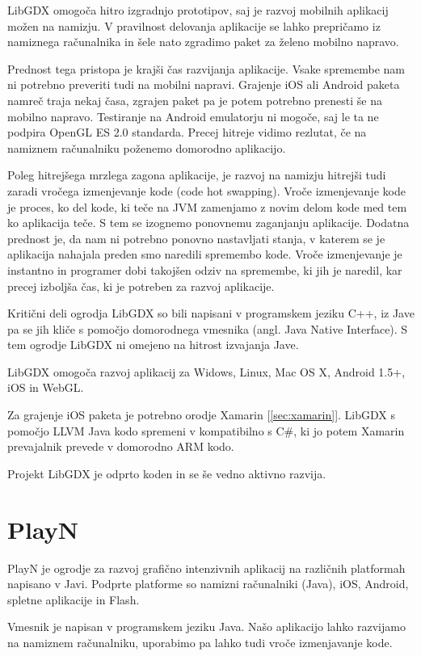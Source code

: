 LibGDX omogoča hitro izgradnjo prototipov, saj je razvoj mobilnih aplikacij možen na namizju. V pravilnost delovanja aplikacije se lahko prepričamo iz namiznega računalnika in šele nato zgradimo paket za želeno mobilno napravo. 

Prednost tega pristopa je krajši čas razvijanja aplikacije. Vsake spremembe nam ni potrebno preveriti tudi na mobilni napravi. Grajenje iOS ali Android paketa namreč traja nekaj časa, zgrajen paket pa je potem potrebno prenesti še na mobilno napravo. Testiranje na Android emulatorju ni mogoče, saj le ta ne podpira OpenGL ES 2.0 standarda. Precej hitreje vidimo rezlutat, če na namiznem računalniku poženemo domorodno aplikacijo.

Poleg hitrejšega mrzlega zagona aplikacije, je razvoj na namizju hitrejši tudi zaradi vročega izmenjevanje kode (code hot swapping). Vroče izmenjevanje kode je proces, ko del kode, ki teče na JVM zamenjamo z novim delom kode med tem ko aplikacija teče. S tem se izognemo ponovnemu zaganjanju aplikacije. Dodatna prednost je, da nam ni potrebno ponovno nastavljati stanja, v katerem se je aplikacija nahajala preden smo naredili spremembo kode. Vroče izmenjevanje je instantno in programer dobi takojšen odziv na spremembe, ki jih je naredil, kar precej izboljša čas, ki je potreben za razvoj aplikacije.

Kritični deli ogrodja LibGDX so bili napisani v programskem jeziku C++, iz Jave pa se jih kliče s pomočjo domorodnega vmesnika (angl. Java Native Interface). S tem ogrodje LibGDX ni omejeno na hitrost izvajanja Jave.

LibGDX omogoča razvoj aplikacij za Widows, Linux, Mac OS X, Android 1.5+, iOS in WebGL. 

Za grajenje iOS paketa je potrebno orodje Xamarin [\ref{sec:xamarin}]. LibGDX s pomočjo LLVM Java kodo spremeni v kompatibilno s C\#, ki jo potem Xamarin prevajalnik prevede v domorodno ARM kodo.

Projekt LibGDX je odprto koden in se še vedno aktivno razvija.

\section{PlayN}
\label{sec:playn}
PlayN \cite{playn} je ogrodje za razvoj grafično intenzivnih aplikacij na različnih platformah napisano v Javi. Podprte platforme so namizni računalniki (Java), iOS, Android, spletne aplikacije in Flash.

Vmesnik je napisan v programskem jeziku Java. Našo aplikacijo lahko razvijamo na namiznem računalniku, uporabimo pa lahko tudi vroče izmenjavanje kode. 

